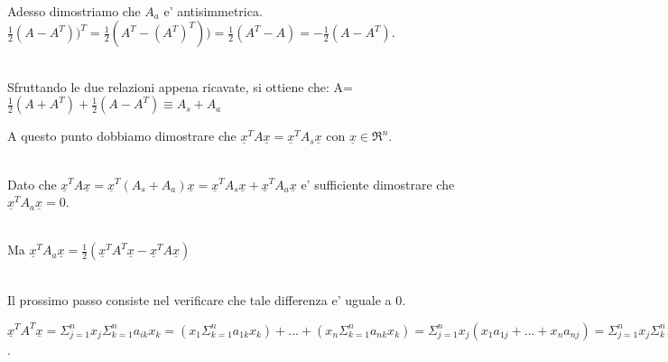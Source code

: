 \documentclass[20pt,a4paper]{book}
\begin{document}
\begin{mah}
\\Adesso dimostriamo che \begin{math}A_{a}\end{math} e' antisimmetrica.
\\ \begin{math}\frac{1}{2}(A-A^{T}))^{T}=\frac{1}{2}(A^{T}-(A^{T})^{T}))=\frac{1}{2}(A^{T}-A)= -\frac{1}{2}(A-A^{T})\end{math}.

\\Sfruttando le due relazioni appena ricavate, si ottiene che:
A=\begin{math}\frac{1}{2}(A+A^{T})+\frac{1}{2}(A-A^{T})\equiv A_{s}+A_{a}\end{math}

A questo punto dobbiamo dimostrare che \begin{math} \underline{x}^{T}A\underline{x}= \underline{x}^{T}A_{s}\underline{x}\end{math} con \begin{math}\underline{x}\in\Re^{n}\end{math}.

\\ Dato che \begin{math}\underline{x}^{T}A\underline{x}= \underline{x}^{T}(A_{s}+A_{a})\underline{x}=\underline{x}^{T}A_{s}\underline{x}+\underline{x}^{T}A_{a}\underline{x}\end{math} e' sufficiente dimostrare che \begin{math}\underline{x}^{T}A_{a}\underline{x}=0\end{math}.

\\Ma \begin{math}\underline{x}^{T}A_{a}\underline{x}=\frac{1}{2}(\underline{x}^{T}A^{T}\underline{x}-\underline{x}^{T}A\underline{x})\end{math}

\\ Il prossimo passo consiste nel verificare che tale differenza e' uguale a 0.

\begin{math}\underline{x}^{T}A^{T}\underline{x}=\Sigma_{j=1}^{n}x_{j}\Sigma_{k=1}^{n}a_{ik}x_{k}=(x_{1}\Sigma_{k=1}^{n}a_{1k}x_{k})+...+(x_{n}\Sigma_{k=1}^{n}a_{nk}x_{k})=\Sigma_{j=1}^{n}x_{j}(x_{1}a_{1j}+...+x_{n}a_{nj})=\Sigma_{j=1}^{n}x_{j}\Sigma_{k=1}^{n}x_{k}a_{kj}=\Sigma_{j=1}^{n}x_{j}\Sigma_{k=1}^{n}a_{kj}x_{k}=\underline{x}^{T}A\underline{x}\end{math}.


\end{mah}
\end{document}
